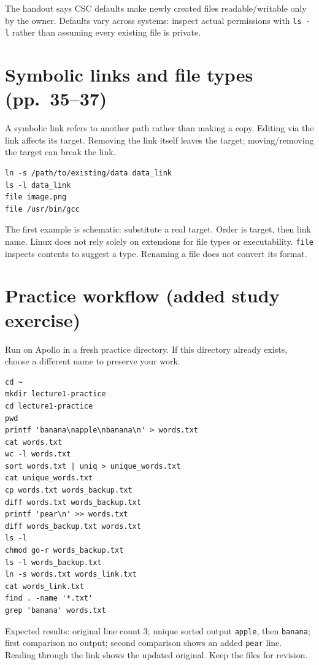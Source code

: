\documentclass[11pt,a4paper]{article}
\begin{document}
The handout says CSC defaults make newly created files readable/writable only by the owner. Defaults vary across systems: inspect actual permissions with \texttt{ls -l} rather than assuming every existing file is private.
\section{Symbolic links and file types (pp.~35--37)}
A symbolic link refers to another path rather than making a copy. Editing via the link affects its target. Removing the link itself leaves the target; moving/removing the target can break the link.
\begin{lstlisting}
ln -s /path/to/existing/data data_link
ls -l data_link
file image.png
file /usr/bin/gcc
\end{lstlisting}
The first example is schematic: substitute a real target. Order is target, then link name. Linux does not rely solely on extensions for file types or executability. \texttt{file} inspects contents to suggest a type. Renaming a file does not convert its format.
\section{Practice workflow (added study exercise)}
Run on Apollo in a fresh practice directory. If this directory already exists, choose a different name to preserve your work.
\begin{lstlisting}
cd ~
mkdir lecture1-practice
cd lecture1-practice
pwd
printf 'banana\napple\nbanana\n' > words.txt
cat words.txt
wc -l words.txt
sort words.txt | uniq > unique_words.txt
cat unique_words.txt
cp words.txt words_backup.txt
diff words.txt words_backup.txt
printf 'pear\n' >> words.txt
diff words_backup.txt words.txt
ls -l
chmod go-r words_backup.txt
ls -l words_backup.txt
ln -s words.txt words_link.txt
cat words_link.txt
find . -name '*.txt'
grep 'banana' words.txt
\end{lstlisting}
Expected results: original line count 3; unique sorted output \texttt{apple}, then \texttt{banana}; first comparison no output; second comparison shows an added \texttt{pear} line. Reading through the link shows the updated original. Keep the files for revision.
\end{document}
